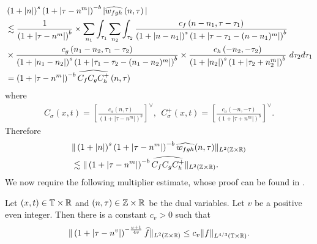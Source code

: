 \begin{equation*}
	\begin{split}
		& \left (1 + |n| \right )^s \left( 1 +  | \tau - n^{m }  | \right)^{-b} | 
		\widehat{w_{fgh}}\left( n, \tau \right) | 
		\\
    & \lesssim  \frac{1}{\left( 1 +
		| \tau - n^{m}| 
		\right)^{b}}  
		\times
    \sum_{n_{1} } \int_{\tau_{1}} \sum_{n_{2}}
    \int_{\tau_{2}} \frac{c_f\left( n - n_{1}, \tau - \tau_1 
		\right)}{\left (1 + |n - n_{1}| \right )^s \left( 1 + | \tau - \tau_1 - (n - n_{1})^{m} |
		\right)^{b}}
		\\
		& \times \frac{c_{g}\left( n_1 - n_2, \tau_1 - \tau_2 \right)}{\left (1 + |n_1 - n_2| \right ) 
		^s\left( 1 + | \tau_1 - \tau_2 -  (n_1 - n_2)^{m }| 
		\right)^{b}}
    \times \frac{c_{h}\left( -n_2, -\tau_2 \right)}{\left (1 + |n_2| \right )
    ^s\left( 1 + | \tau_2 + n_2^{m } | \right)^{b}} \ d \tau_2 d \tau_1 
    \\
		& = \left( 1 + | \tau - n^{m } | \right)^{-b}
		\widehat{C_f C_{g} C^+_{h}} \left( n, \tau \right)
	\end{split}
\end{equation*}
%
%
where
%
%
\begin{equation*}
	\begin{split}
		C_\sigma(x, t) = \left[ \frac{c_\sigma\left( n, \tau \right)}{\left( 
		1 + | \tau - n^{m } | \right)^{b}} \right]^\vee,
		\ \ C^+_\sigma(x, t) = \left[ \frac{c_\sigma\left( -n, -\tau \right)}{\left( 
		1 + | \tau + n^{m } | \right)^{b}} \right]^\vee.
	\end{split}
\end{equation*}
%
%
Therefore
%
%
\begin{equation}
	\label{ngen-holder-pre-estimate}
	\begin{split}
		& \| \left( 1 + |n | \right)^s
		\left( 1 + | \tau - n^{m } | \right)^{-b} \widehat{w_{fgh}}(n, 
		\tau)		
		\|_{L^2(\mathbb{Z} \times \mathbb{R})}
		\\
		& \lesssim \| \left( 1 + | \tau - n^{m } | \right)^{-b}
		\widehat{C_f C_{g} C^+_{h}} \|_{L^2(\mathbb{Z} \times \mathbb{R})}.
	\end{split}
\end{equation}
%
We now require the following multiplier estimate, whose proof can be found in 
\cite{Himonas-Misiolek-2001-A-priori-estimates-for-Schrodinger}.
%
%
%
%
%
%
%
%
%
%
%
%
%
%
\begin{lemma}
	\label{nlem:four-mult-est-L4}
	Let $(x, t) \in \mathbb{T} \times \mathbb{R} $ and $(n, \tau) \in \mathbb{Z} \times \mathbb{R}$ be 
	the dual variables. Let $v$ be a positive even integer. Then there is a 
	constant $c_v > 0$ such that
%
%
\begin{equation}
	\label{nfour-mult-est-L4*}
	\begin{split}
		\| \left( 1 + | \tau - n^v | 
		\right)^{-\frac{v+1}{4v}}
		\widehat{f}\|_{L^2(\mathbb{Z} \times \mathbb{R})} \le c_v \|f \|_{L^{4/3}( \mathbb{T} \times \mathbb{R})}.
	\end{split}
\end{equation}
%
%
\end{lemma}
